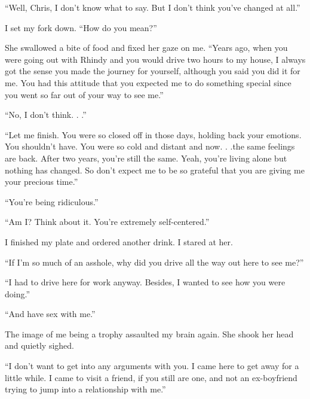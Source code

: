 ``Well, Chris, I don't know what to say. But I don't think you've
changed at all.''

I set my fork down. ``How do you mean?''

She swallowed a bite of food and fixed her gaze on me. ``Years ago, when
you were going out with Rhindy and you would drive two hours to my
house, I always got the sense you made the journey for yourself,
although you said you did it for me. You had this attitude that you
expected me to do something special since you went so far out of your
way to see me.''

``No, I don't think. . .''

``Let me finish. You were so closed off in those days, holding back your
emotions. You shouldn't have. You were so cold and distant and now. .
.the same feelings are back. After two years, you're still the same.
Yeah, you're living alone but nothing has changed. So don't expect me to
be so grateful that you are giving me your precious time.''

``You're being ridiculous.''

``Am I? Think about it. You're extremely self-centered.''

I finished my plate and ordered another drink. I stared at her.

``If I'm so much of an asshole, why did you drive all the way out here
to see me?''

``I had to drive here for work anyway. Besides, I wanted to see how you
were doing.''

``And have sex with me.''

The image of me being a trophy assaulted my brain again. She shook her
head and quietly sighed.

``I don't want to get into any arguments with you. I came here to get
away for a little while. I came to visit a friend, if you still are one,
and not an ex-boyfriend trying to jump into a relationship with me.''

